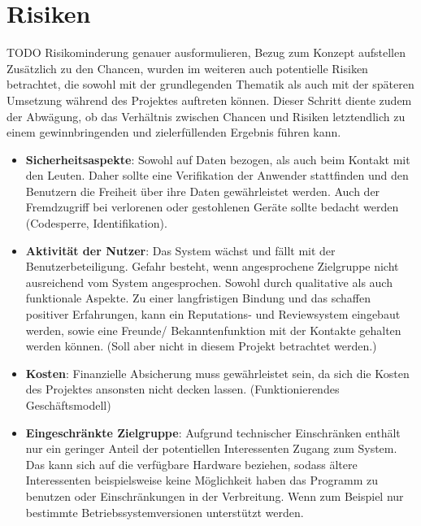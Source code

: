 
\section{Risiken}

TODO Risikominderung genauer ausformulieren, Bezug zum Konzept aufstellen
Zusätzlich zu den Chancen, wurden im weiteren auch potentielle Risiken betrachtet, die sowohl mit der grundlegenden Thematik als auch mit der späteren Umsetzung während des Projektes auftreten können.
Dieser Schritt diente zudem der Abwägung, ob das Verhältnis zwischen Chancen und Risiken letztendlich zu einem gewinnbringenden und zielerfüllenden Ergebnis führen kann.\\

\begin{itemize}
   \item \textbf{Sicherheitsaspekte}: Sowohl auf Daten bezogen, als auch beim Kontakt mit den Leuten. Daher sollte eine Verifikation der Anwender stattfinden und den Benutzern die Freiheit über ihre Daten gewährleistet werden. Auch der Fremdzugriff bei verlorenen oder gestohlenen Geräte sollte bedacht werden (Codesperre, Identifikation).

   \item \textbf{Aktivität der Nutzer}: Das System wächst und fällt mit der Benutzerbeteiligung. Gefahr besteht, wenn angesprochene Zielgruppe nicht ausreichend vom System angesprochen. Sowohl durch qualitative als auch funktionale Aspekte. Zu einer langfristigen Bindung und das schaffen positiver Erfahrungen, kann ein Reputations- und Reviewsystem eingebaut werden, sowie eine Freunde/ Bekanntenfunktion mit der Kontakte gehalten werden können. (Soll aber nicht in diesem Projekt betrachtet werden.)

   \item \textbf{Kosten}: Finanzielle Absicherung muss gewährleistet sein, da sich die Kosten des Projektes ansonsten nicht decken lassen. 
   (Funktionierendes Geschäftsmodell)

   \item \textbf{Eingeschränkte Zielgruppe}:
   Aufgrund technischer Einschränken enthält nur ein geringer Anteil der potentiellen Interessenten Zugang zum System. Das kann sich auf die verfügbare Hardware beziehen, sodass ältere Interessenten beispielsweise keine Möglichkeit haben das Programm zu benutzen oder Einschränkungen in der Verbreitung. Wenn zum Beispiel nur bestimmte Betriebssystemversionen unterstützt werden.
     

\end{itemize}
